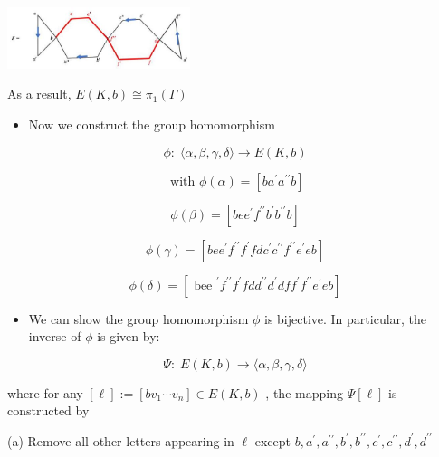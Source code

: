 \begin{center}
\includegraphics[max width=0.4\textwidth]{images/bo_d2bcsrref24c73avs720_147_695_1382_553_186_0.jpg}
\end{center}
\hspace*{3em} 

As a result, \(E\left( {K,b}\right)  \cong  {\pi }_{1}\left( \Gamma \right)\)

\begin{itemize}
\item Now we construct the group homomorphism
\end{itemize}

\[
\phi  : \;\langle \alpha ,\beta ,\gamma ,\delta \rangle  \rightarrow  E\left( {K,b}\right)
\]

\[
\text{ with }\phi \left( \alpha \right)  = \left\lbrack  {b{a}^{\prime }{a}^{\prime \prime }b}\right\rbrack
\]

\[
\phi \left( \beta \right)  = \left\lbrack  {{be}{e}^{\prime }{f}^{\prime \prime }{b}^{\prime }{b}^{\prime \prime }b}\right\rbrack
\]

\[
\phi \left( \gamma \right)  = \left\lbrack  {{be}{e}^{\prime }{f}^{\prime \prime }{f}^{\prime }{fd}{c}^{\prime }{c}^{\prime \prime }{f}^{\prime \prime }{e}^{\prime }{eb}}\right\rbrack
\]

\[
\phi \left( \delta \right)  = \left\lbrack  {{\text{ bee }}^{\prime }{f}^{\prime \prime }{f}^{\prime }{fd}{d}^{\prime \prime }{d}^{\prime }{df}{f}^{\prime }{f}^{\prime \prime }{e}^{\prime }{eb}}\right\rbrack
\]

\begin{itemize}
\item We can show the group homomorphism \(\phi\) is bijective. In particular, the inverse of \(\phi\) is given by:
\end{itemize}

\[
\Psi  : \;E\left( {K,b}\right)  \rightarrow  \langle \alpha ,\beta ,\gamma ,\delta \rangle
\]

where for any \(\left\lbrack  \ell \right\rbrack   \mathrel{\text{ := }} \left\lbrack  {b{v}_{1}\cdots {v}_{n}}\right\rbrack   \in  E\left( {K,b}\right)\) , the mapping \(\Psi \left\lbrack  \ell \right\rbrack\) is constructed by

(a) Remove all other letters appearing in \(\ell\) except \(b,{a}^{\prime },{a}^{\prime \prime },{b}^{\prime },{b}^{\prime \prime },{c}^{\prime },{c}^{\prime \prime },{d}^{\prime },{d}^{\prime \prime }\)

